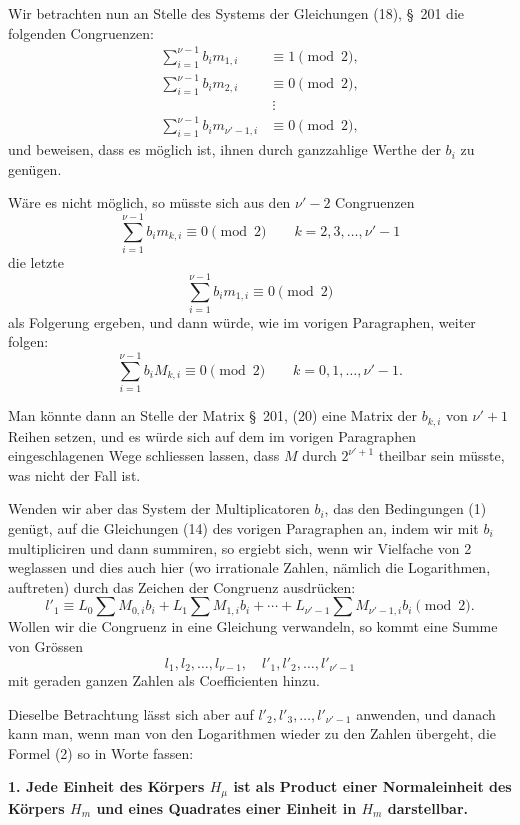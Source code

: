 \documentclass[11pt]{article}
\begin{document}
Wir betrachten nun an Stelle des Systems der Gleichungen (18), \S~201 die folgenden Congruenzen:
\begin{equation}
\begin{aligned}
\sum_{i=1}^{\nu-1}b_i m_{1,i}&\equiv1\pmod2,\\
\sum_{i=1}^{\nu-1}b_i m_{2,i}&\equiv0\pmod2,\\
&\ \vdots\\
\sum_{i=1}^{\nu-1}b_i m_{\nu'-1,i}&\equiv0\pmod2,
\end{aligned}
\tag{1}
\end{equation}
und beweisen, dass es möglich ist, ihnen durch ganzzahlige Werthe der $b_i$ zu genügen.

Wäre es nicht möglich, so müsste sich aus den $\nu'-2$ Congruenzen
\[
\sum_{i=1}^{\nu-1}b_i m_{k,i}\equiv0\pmod2\qquad k=2,3,\ldots,\nu'-1
\]
die letzte
\[
\sum_{i=1}^{\nu-1}b_i m_{1,i}\equiv0\pmod2
\]
als Folgerung ergeben, und dann würde, wie im vorigen Paragraphen, weiter folgen:
\[
\sum_{i=1}^{\nu-1}b_i M_{k,i}\equiv0\pmod2\qquad k=0,1,\ldots,\nu'-1.
\]

Man könnte dann an Stelle der Matrix \S~201, (20) eine Matrix der $b_{k,i}$ von $\nu'+1$ Reihen setzen, und es würde sich auf dem im vorigen Paragraphen eingeschlagenen Wege schliessen lassen, dass $M$ durch $2^{\nu'+1}$ theilbar sein müsste, was nicht der Fall ist.

Wenden wir aber das System der Multiplicatoren $b_i$, das den Bedingungen (1) genügt, auf die Gleichungen (14) des vorigen Paragraphen an, indem wir mit $b_i$ multipliciren und dann summiren, so ergiebt sich, wenn wir Vielfache von 2 weglassen und dies auch hier (wo irrationale Zahlen, nämlich die Logarithmen, auftreten) durch das Zeichen der Congruenz ausdrücken:
\begin{equation}
l'_1\equiv L_0\sum M_{0,i}b_i+L_1\sum M_{1,i}b_i+\cdots+L_{\nu'-1}\sum M_{\nu'-1,i}b_i\pmod2.
\tag{2}
\end{equation}
Wollen wir die Congruenz in eine Gleichung verwandeln, so kommt eine Summe von Grössen
\[
l_1,l_2,\ldots,l_{\nu-1},\quad l'_1,l'_2,\ldots,l'_{\nu'-1}
\]
mit geraden ganzen Zahlen als Coefficienten hinzu.

Dieselbe Betrachtung lässt sich aber auf $l'_2,l'_3,\ldots,l'_{\nu'-1}$ anwenden, und danach kann man, wenn man von den Logarithmen wieder zu den Zahlen übergeht, die Formel (2) so in Worte fassen:

\begin{center}\textbf{1. Jede Einheit des Körpers $H_\mu$ ist als Product einer Normaleinheit des Körpers $H_m$ und eines Quadrates einer Einheit in $H_m$ darstellbar.}\end{center}
\end{document}

